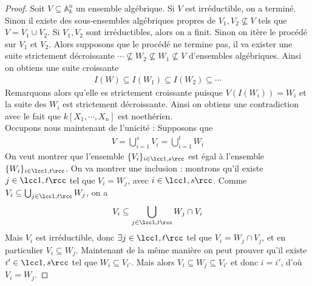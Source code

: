             \begin{proof}
                Soit $V \subseteq \mathbb{A}_k^n$ un ensemble algébrique. Si $V$ est irréductible, on a terminé. Sinon il existe des sous-ensembles algébriques propres de $V_1, V_2 \nsubseteq V$ tels que $V = V_1 \cup V_2$. Si $V_1,V_2$ sont irréductibles, alors on a finit. Sinon on itère le procédé sur $V_1$ et $V_2$. Alors supposons que le procédé ne termine pas, il va exister une suite strictement décroissante $\cdots \nsubseteq W_2 \nsubseteq W_1 \nsubseteq V$ d'ensembles algébriques. Ainsi on obtiens une suite croissante
                \begin{align*}
                    I(W) \subseteq I(W_1) \subseteq I(W_2) \subseteq \cdots
                \end{align*}
                Remarquons alors qu'elle es strictement croissante puisque $V(I(W_i)) = W_i$ et la suite des $W_i$ est strictement décroissante. Ainsi on obtiens une contradiction avec le fait que $k[X_1, \cdots, X_n]$ est noethérien. \\
                Occupons nous maintenant de l'unicité : Supposons que 
                \begin{align*}
                    V = \bigcup_{i = 1}^s V_i = \bigcup_{i = 1}^t W_i
                \end{align*}
                On veut montrer que l'ensemble $\{V_i\}_{i \in \lcc 1,s \rcc}$ est égal à l'ensemble $\{W_i\}_{i \in \lcc 1,t \rcc}$. On va montrer une inclusion : montrons qu'il existe $j \in \lcc 1,t \rcc$ tel que $V_i = W_j$, avec $i \in \lcc 1,s \rcc$. Comme $V_i \subseteq \bigcup_{j \in \lcc 1,t \rcc} W_j$, on a
                \begin{align*}
                    V_i \subseteq \bigcup_{j \in \lcc 1,t \rcc} W_j \cap V_i
                \end{align*}
                Mais $V_i$ est irréductible, donc $\exists j \in \lcc 1,t \rcc$ tel que $V_i = W_j \cap V_j$, et en particulier $V_i \subseteq W_j$. Maintenant de la même manière on peut prouver qu'il existe $i' \in \lcc 1,s \rcc$ tel que $W_i \subseteq V_{i'}$. Mais alors $V_i \subseteq W_j \subseteq V_{i'}$ et donc $i = i'$, d'où $V_i = W_j$.
            \end{proof}
            






 
                